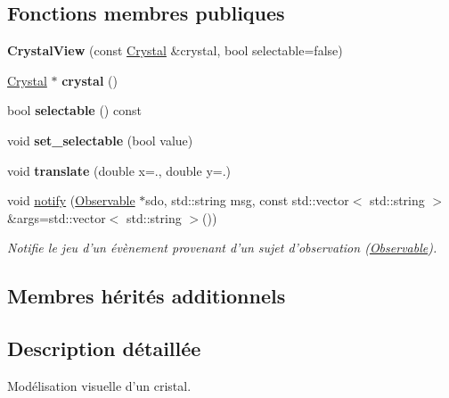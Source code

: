 \subsection*{Fonctions membres publiques}
\begin{DoxyCompactItemize}
\item 
\hypertarget{classCrystalView_a82ec82a190920476f9ae64aca5691ceb}{{\bfseries Crystal\+View} (const \hyperlink{classCrystal}{Crystal} \&crystal, bool selectable=false)}\label{classCrystalView_a82ec82a190920476f9ae64aca5691ceb}

\item 
\hypertarget{classCrystalView_a0168a3da89580fb0c5467f88c635ac9f}{\hyperlink{classCrystal}{Crystal} $\ast$ {\bfseries crystal} ()}\label{classCrystalView_a0168a3da89580fb0c5467f88c635ac9f}

\item 
\hypertarget{classCrystalView_a6fffe79b15c269a44f9c393ed163f205}{bool {\bfseries selectable} () const }\label{classCrystalView_a6fffe79b15c269a44f9c393ed163f205}

\item 
\hypertarget{classCrystalView_ab2a8ffda8203f9d645fa137ba8542ce4}{void {\bfseries set\+\_\+selectable} (bool value)}\label{classCrystalView_ab2a8ffda8203f9d645fa137ba8542ce4}

\item 
\hypertarget{classCrystalView_adc16471475cf13a0cd815f587ae0b012}{void {\bfseries translate} (double x=., double y=.)}\label{classCrystalView_adc16471475cf13a0cd815f587ae0b012}

\item 
void \hyperlink{classCrystalView_a167f2bc5e7fd6e7daaca9fc39e475806}{notify} (\hyperlink{classObservable}{Observable} $\ast$sdo, std\+::string msg, const std\+::vector$<$ std\+::string $>$ \&args=std\+::vector$<$ std\+::string $>$())
\begin{DoxyCompactList}\small\item\em Notifie le jeu d'un évènement provenant d'un sujet d'observation (\hyperlink{classObservable}{Observable}). \end{DoxyCompactList}\end{DoxyCompactItemize}
\subsection*{Membres hérités additionnels}


\subsection{Description détaillée}
Modélisation visuelle d’un cristal. 

